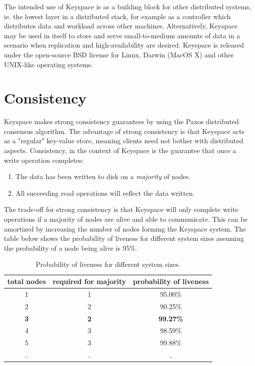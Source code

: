 \documentclass[12pt]{article}
\begin{document}
The intended use of Keyspace is as a building block for other distributed systems, ie. the lowest layer in a distributed stack, for example as a controller which distributes data and workload across other machines. Alternatively, Keyspace may be used in itself to store and serve small-to-medium amounts of data in a scenario when replication and high-availability are desired. Keyspace is released under the open-source BSD license for Linux, Darwin (MacOS X) and other UNIX-like operating systems.

\section{ Consistency }

Keyspace makes strong consistency guarantees by using the Paxos distributed consensus algorithm. The advantage of strong consistency is that Keyspace acts as a "regular" key-value store, meaning clients need not bother with distributed aspects. Consistency, in the context of Keyspace is the guarantee that once a write operation completes:

\begin{enumerate}
\item The data has been written to disk on a \textit{majority} of nodes.
\item All succeeding read operations will reflect the data written.
\end{enumerate}

The trade-off for strong consistency is that Keyspace will only complete write operations if a majority of nodes are alive and able to communicate. This can be amortized by increasing the number of nodes forming the Keyspace system. The table below shows the probability of liveness for different system sizes assuming the probability of a node being alive is 95\%.

\begin{table}[h]
\begin{center}
\begin{tabular}{ | c | c | c | }
\hline
total nodes & required for majority & probability of liveness \\
\hline \hline
1 & 1 & 95.00\% \\ \hline
2 & 2 & 90.25\% \\ \hline
\textbf{3} & \textbf{2} & \textbf{99.27\%} \\ \hline
4 & 3 & 98.59\% \\ \hline
5 & 3 & 99.88\% \\ \hline
.. & .. & .. \\ \hline
\end{tabular}
\caption{ Probability of liveness for different system sizes. }
\end{center}
\end{table}
\end{document}
